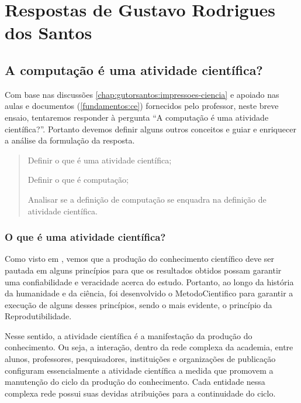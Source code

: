 \section{Respostas de Gustavo Rodrigues dos Santos\label{tarefa-gutorsantos-tarefa-5-1}}

\subsection{A computação é uma atividade científica?}

Com base nas discussões \ref{chap:gutorsantos:impressoes-ciencia} e apoiado nas aulas e documentos (\ref{fundamentos:ce}) fornecidos pelo professor, neste breve ensaio, tentaremos responder à pergunta ``A computação é uma atividade científica?''. Portanto devemos definir alguns outros conceitos e guiar e enriquecer a análise da formulação da resposta.

\begin{quote}
Definir o que é uma atividade científica;

Definir o que é computação;

Analisar se a definição de computação se enquadra na definição de atividade científica. 
\end{quote}

\subsubsection{O que é uma atividade científica?} 

Como visto em \cite{fernandes_consideracoes_2021}, vemos que a produção do conhecimento científico deve ser pautada em alguns princípios para que os resultados obtidos possam garantir uma confiabilidade e veracidade acerca do estudo. Portanto, ao longo da história da humanidade e da ciência, foi desenvolvido o \gls{MetodoCientifico} para garantir a execução de alguns desses princípios, sendo o mais evidente, o princípio da Reprodutibilidade.

Nesse sentido, a atividade científica é a manifestação da produção do conhecimento. Ou seja, a interação, dentro da rede complexa da academia, entre alunos, professores, pesquisadores, instituições e organizações de publicação configuram essencialmente a atividade científica a medida que promovem a manutenção do ciclo da produção do conhecimento. Cada entidade nessa complexa rede possui suas devidas atribuições para a continuidade do ciclo. 

